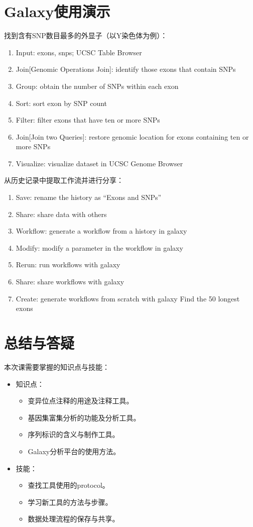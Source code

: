\section{Galaxy使用演示} 
找到含有SNP数目最多的外显子（以Y染色体为例）：
\begin{enumerate}
	\item Input: exons, snps; UCSC Table Browser
	\item Join[Genomic Operations Join]: identify those exons that contain SNPs
	\item Group: obtain the number of SNPs within each exon
	\item Sort: sort exon by SNP count
	\item Filter: filter exons that have ten or more SNPs
	\item Join[Join two Queries]: restore genomic location for exons containing ten or more SNPs
	\item Visualize: visualize dataset in UCSC Genome Browser
\end{enumerate}

从历史记录中提取工作流并进行分享：
\begin{enumerate}
	\item Save: rename the history as “Exons and SNPs”
	\item Share: share data with others
	\item Workflow: generate a workflow from a history in galaxy
	\item Modify: modify a parameter in the workflow in galaxy
	\item Rerun: run workflows with galaxy
	\item Share: share workflows with galaxy
	\item Create: generate workflows from scratch with galaxy Find the 50 longest exons
\end{enumerate}

\section{总结与答疑}
本次课需要掌握的知识点与技能：
\begin{itemize}
	\item 知识点：
		\begin{itemize}
			\item 变异位点注释的用途及注释工具。
			\item 基因集富集分析的功能及分析工具。
			\item 序列标识的含义与制作工具。
			\item Galaxy分析平台的使用方法。
		\end{itemize}
	\item 技能：
		\begin{itemize}
			\item 查找工具使用的protocol。
			\item 学习新工具的方法与步骤。
			\item 数据处理流程的保存与共享。
		\end{itemize}
\end{itemize}



